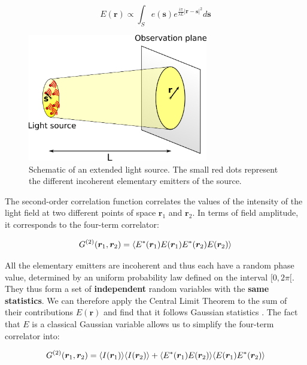 \begin{equation}
    E(\bm{r}) \propto \int_{S} e(\bm{s}) e^{\frac{i \pi}{\lambda L}|\bm{r}-\bm{s}|^{2}} d \bm{s}
    \label{eq:amp_HBT}
\end{equation}

\begin{figure}
    \centering
    \includegraphics[width=0.7\textwidth]{Fig/Chapter1/source_and_plane.png}
    \caption[Schematic of an extended light source]{Schematic of an extended light source. The small red dots represent the different incoherent elementary emitters of the source.}
    \label{fig:source_and_plane}
\end{figure}

The second-order correlation function correlates the values of the intensity of the light field at two different points of space $\bm{r}_1$ and $\bm{r}_2$. In terms of field amplitude, it corresponds to the four-term correlator:

\begin{equation}
    G^{(2)} (\bm{r}_1,\bm{r}_2) = \langle E^*(\bm{r}_1) E(\bm{r}_1) E^*(\bm{r}_2) E(\bm{r}_2)\rangle
\end{equation}

\noindent All the elementary emitters are incoherent and thus each have a random phase value, determined by an uniform probability law defined on the interval $[0,2\pi[$. They thus form a set of \textbf{independent} random variables with the \textbf{same statistics}. We can therefore apply the Central Limit Theorem to the sum of their contributions $E(\bm{r})$ and find that it follows Gaussian statistics \cite{goodman2007speckle}. The fact that $E$ is a classical Gaussian variable allows us to simplify the four-term correlator into:

\begin{equation}
     G^{(2)} (\bm{r}_1,\bm{r}_2) = \langle I(\bm{r}_1)\rangle \langle I(\bm{r}_2)\rangle + \langle E^*(\bm{r}_1) E(\bm{r}_2)\rangle \langle E(\bm{r}_1) E^*(\bm{r}_2)\rangle
\end{equation}

